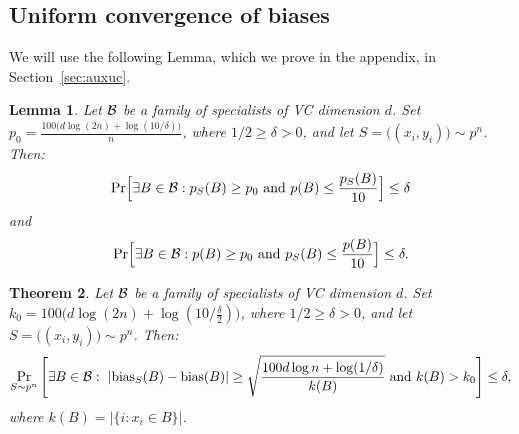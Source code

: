 \documentclass{article}
\newtheorem{theorem}{Theorem}[section]
\newtheorem{lemma}[theorem]{Lemma}
\newcommand{\B}{{\cal B}}
\newcommand{\bias}{\text{bias}}
\newcommand{\samp}{S}
\newcommand{\eps}{\epsilon}
\begin{document}
\subsection{Uniform convergence of biases}

We will use the following Lemma, which we prove in the appendix, in Section~\ref{sec:auxuc}.
\begin{lemma}\label{lem:auxuc}
Let $\B$ be a family of specialists of VC dimension $d$.
Set $p_0 = \frac{100\bigl(d\log(2n) + \log(10/\delta)\bigr)}{n}$, 
where $1/2\geq \delta>0$,
and let $S=\bigl((x_i,y_i)\bigr) \sim p^n$.
Then:
\[
\Pr
\Bigl[
\exists {B\in\B}: p_{\samp}(B) \geq p_0 \mbox{ and } p(B) \leq \frac{p_{\samp}(B)}{10}
\Bigr]\leq \delta
\]
and
\[
\Pr
\Bigl[
\exists {B\in\B}: p(B) \geq p_0 \mbox{ and } p_{\samp}(B) \leq \frac{p(B)}{10}
\Bigr]\leq \delta.
\]


\end{lemma}

\begin{theorem}
Let $\B$ be a family of specialists of VC dimension $d$.
Set $k_0 = 100\bigl(d\log(2n) + \log(10/\frac{\delta}{2})\bigr)$, where
 $1/2\geq \delta>0$,
and let $S=\bigl((x_i,y_i)\bigr) \sim p^n$.
Then:
\[\Pr_{\samp\sim p^n}\left[\exists {B\in\B}:~\lvert
  \bias_{\samp}(B) -  \bias(B)\rvert \geq \sqrt{\frac{100d\log n +
      \log(1/\delta)}{k(B)} }
  \mbox{ and } k(B)>k_0
  \right] \leq \delta,
\]
where $k(B) = \lvert\{ i : x_i\in B \}\rvert$.
\end{theorem}
\end{document}
